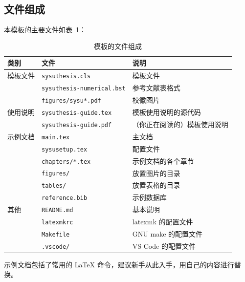 \documentclass[a4paper]{ltxdoc}
\DeclareRobustCommand\file{\nolinkurl}
\begin{document}
\subsection{文件组成}
本模板的主要文件如表~\ref{tab:files}：
\begin{table}[htb]
  \centering\small
  \caption{模板的文件组成}
  \label{tab:files}
  \begin{tabular}{lll}
    \toprule
    类别     & 文件                      & 说明                         \\
    \midrule
    模板文件 & \file{sysuthesis.cls}     & 模板文件                     \\
             & \file{sysuthesis-numerical.bst}   & \BibTeX{} 参考文献表格式     \\
             & \file{figures/sysu*.pdf} & 校徽图片               \\
    \midrule
    使用说明 & \file{sysuthesis-guide.tex} & 模板使用说明的源代码         \\
             & \file{sysuthesis-guide.pdf} & （你正在阅读的）模板使用说明 \\
    \midrule
    示例文档 & \file{main.tex}           & 主文档                       \\
             & \file{sysusetup.tex}      & 配置文件                     \\
             & \file{chapters/*.tex}     & 示例文档的各个章节           \\
             & \file{figures/}           & 放置图片的目录               \\
             & \file{tables/}            & 放置表格的目录               \\
             & \file{reference.bib}       & \BibTeX{} 示例数据库         \\
    \midrule
    其他     & \file{README.md}          & 基本说明                     \\
             & \file{latexmkrc}          & latexmk 的配置文件           \\
             & \file{Makefile}           & GNU make 的配置文件          \\
             & \file{.vscode/}           & VS Code 的配置文件           \\
    \bottomrule
  \end{tabular}
\end{table}

示例文档包括了常用的 \LaTeX{} 命令，建议新手从此入手，用自己的内容进行替换。
\end{document}

